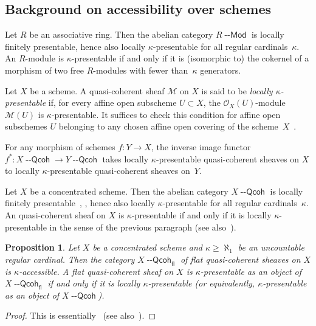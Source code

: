 \documentclass[12pt,a4paper]{amsart}
\newcommand{\+}{\protect\nobreakdash-}
\renewcommand{\:}{\colon}
\newcommand{\rarrow}{\longrightarrow}
\newcommand{\Modl}{{\operatorname{\mathsf{--Mod}}}}
\newcommand{\Qcoh}{{\operatorname{\mathsf{--Qcoh}}}}
\newcommand{\fl}{\mathsf{fl}}
\newcommand{\cO}{\mathcal O}
\newcommand{\cM}{\mathcal M}
\theoremstyle{plain}
\newtheorem{prop}[thm]{Proposition}
\theoremstyle{definition}
\begin{document}
\subsection{Background on accessibility over schemes}
 Let $R$ be an associative ring.
 Then the abelian category $R\Modl$ is locally finitely presentable,
hence also locally $\kappa$\+presentable for all regular
cardinals~$\kappa$.
 An $R$\+module is $\kappa$\+presentable if and only if it is
(isomorphic to) the cokernel of a morphism of two free $R$\+modules
with fewer than~$\kappa$ generators.

 Let $X$ be a scheme.
 A quasi-coherent sheaf $\cM$ on $X$ is said to be \emph{locally\/
$\kappa$\+presentable} if, for every affine open subscheme
$U\subset X$, the $\cO_X(U)$\+module $\cM(U)$ is $\kappa$\+presentable.
 It suffices to check this condition for affine open subschemes $U$
belonging to any chosen affine open covering of the scheme~$X$
\,\cite[Lemma~3.1]{PS6}.

 For any morphism of schemes $f\:Y\rarrow X$, the inverse image
functor $f^*\:X\Qcoh\allowbreak\rarrow Y\Qcoh$ takes locally
$\kappa$\+presentable quasi-coherent sheaves on $X$ to locally
$\kappa$\+presentable quasi-coherent sheaves on~$Y$.

 Let $X$ be a concentrated scheme.
 Then the abelian category $X\Qcoh$ is locally finitely
presentable~\cite[0.5.2.5 and Corollaire~I.6.9.12]{EGA1},
\cite[Definition Tag~01BN and Lemma Tag~01PJ or~01PK]{SP},
hence also locally $\kappa$\+presentable for all regular
cardinals~$\kappa$.
 An quasi-coherent sheaf on $X$ is $\kappa$\+presentable if and only
if it is locally $\kappa$\+presentable in the sense of the previous
paragraph (see also~\cite[Remark~4.6]{PS6}).

\begin{prop} \label{flat-qcoh-sheaves-accessible}
 Let $X$ be a concentrated scheme and\/ $\kappa\ge\aleph_1$ be
an uncountable regular cardinal.
 Then the category $X\Qcoh_\fl$ of flat quasi-coherent sheaves on
$X$ is\/ $\kappa$\+accessible.
 A flat quasi-coherent sheaf on $X$ is\/ $\kappa$\+presentable as
an object of $X\Qcoh_\fl$ if and only if it is locally\/
$\kappa$\+presentable (or equivalently, $\kappa$\+presentable as
an object of $X\Qcoh$).
\end{prop}

\begin{proof}
 This is essentially~\cite[Theorem~3.5]{PS6} (see
also~\cite[Theorem~4.5]{PS6}).
\end{proof}
\end{document}
